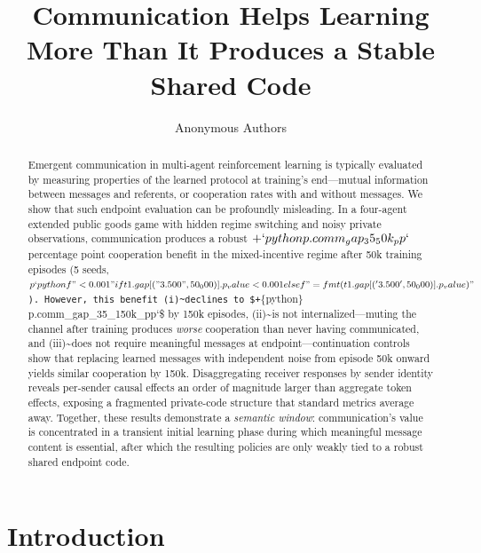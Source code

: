 \documentclass[
  10pt,
  letterpaper,
]{article}
\title{Communication Helps Learning More Than It Produces a Stable
Shared Code}
\author{%
  Anonymous Authors \\
}
\newcommand{\pp}{\text{\,pp}}
\begin{document}
\maketitle
\ifdefined\Shaded\renewenvironment{Shaded}{\begin{tcolorbox}[boxrule=0pt, sharp corners, interior hidden, borderline west={3pt}{0pt}{shadecolor}, frame hidden, enhanced, breakable]}{\end{tcolorbox}}\fi

\begin{abstract}

Emergent communication in multi-agent reinforcement learning is
typically evaluated by measuring properties of the learned protocol at
training's end---mutual information between messages and referents, or
cooperation rates with and without messages. We show that such endpoint
evaluation can be profoundly misleading. In a four-agent extended public
goods game with hidden regime switching and noisy private observations,
communication produces a robust \(+`{python} p.comm_gap_35_50k_pp`\)
percentage point cooperation benefit in the mixed-incentive regime after
50k training episodes (5 seeds,
\(p`{python} f"<0.001" if t1.gap[("3.500", 50_000)].p_value < 0.001 else f"={fmt(t1.gap[('3.500', 50_000)].p_value)}"\)\texttt{).\ However,\ this\ benefit\ (i)\textasciitilde{}declines\ to\ \$+}\{python\}
p.comm\_gap\_35\_150k\_pp`\pp\$ by 150k episodes, (ii)\textasciitilde is
not internalized---muting the channel after training produces
\emph{worse} cooperation than never having communicated, and
(iii)\textasciitilde does not require meaningful messages at
endpoint---continuation controls show that replacing learned messages
with independent noise from episode 50k onward yields similar
cooperation by 150k. Disaggregating receiver responses by sender
identity reveals per-sender causal effects an order of magnitude larger
than aggregate token effects, exposing a fragmented private-code
structure that standard metrics average away. Together, these results
demonstrate a \emph{semantic window}: communication's value is
concentrated in a transient initial learning phase during which
meaningful message content is essential, after which the resulting
policies are only weakly tied to a robust shared endpoint code.

\end{abstract}

\hypertarget{sec-intro}{%
\section{Introduction}\label{sec-intro}}
\end{document}
